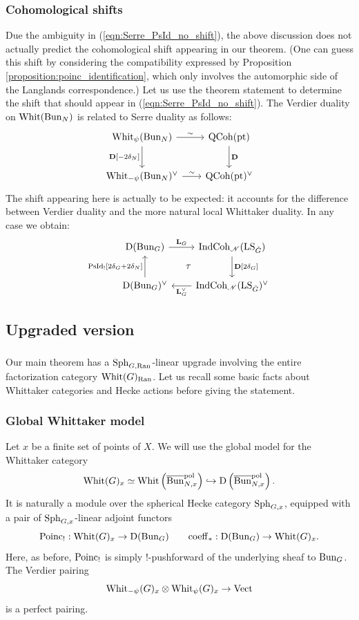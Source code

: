 \subsubsection{Cohomological shifts} Due the ambiguity in (\ref{eqn:Serre_PsId_no_shift}), the above discussion does not actually predict the cohomological shift appearing in our theorem. (One can guess this shift by considering the compatibility expressed by Proposition \ref{proposition:poinc_identification}, which only involves the automorphic side of the Langlands correspondence.) Let us use the theorem statement to determine the shift that should appear in (\ref{eqn:Serre_PsId_no_shift}). The Verdier duality on $\mathrm{Whit}(\mathrm{Bun}_N)$ is related to Serre duality as follows:
\[
\begin{tikzcd}[
  column sep={9em,between origins},
  row sep={4em,between origins}
]
  \Whit_\psi(\Bun_N) \arrow[r, "\sim"] \arrow[d, "\DD{[-2 \delta_N]}" left] & \QCoh(\pt) \arrow[d, "\DD"] \\
  \Whit_{-\psi}(\Bun_N)^\vee \arrow[r, "\sim"] & \QCoh(\pt)^\vee
\end{tikzcd}
\]
The shift appearing here is actually to be expected: it accounts for the difference between Verdier duality and the more natural local Whittaker duality. In any case we obtain:
\[
\begin{tikzcd}[
  column sep={9em,between origins},
  row sep={4em,between origins}
]
  \DMod(\Bun_G) \arrow[r, "\GLL_G"] \arrow[dr, phantom, "\tau"] & \ICoh_\Nilp(\LS_\LG) \arrow[d, "\DD {[2\delta_G]}"] \\
  \DMod(\Bun_G)^\vee \arrow[u, "\PsId_! {[2 \delta_G + 2 \delta_N]}"] & \ICoh_\Nilp(\LS_\LG)^\vee \arrow[l, "\GLL_G^\vee"]
\end{tikzcd}
\]

\subsection{Upgraded version}

\subsubsection{} Our main theorem has a $\mathrm{Sph}_{G,\mathrm{Ran}}$-linear upgrade involving the entire factorization category $\mathrm{Whit}(G)_{\mathrm{Ran}}$. Let us recall some basic facts about Whittaker categories and Hecke actions before giving the statement.

\subsubsection{Global Whittaker model} Let $x$ be a finite set of points of $X$. We will use the global model for the Whittaker category
    \[
    \mathrm{Whit}(G)_x \simeq \mathrm{Whit}\left(\overline{\mathrm{Bun}}_{N,x}^{\mathrm{pol}}\right) \hookrightarrow \mathrm{D}\left(\overline{\mathrm{Bun}}_{N,x}^{\mathrm{pol}} \right).
    \]
It is naturally a module over the spherical Hecke category $\mathrm{Sph}_{G,x}$, equipped with a pair of $\mathrm{Sph}_{G,x}$-linear adjoint functors
    \[
    \mathrm{Poinc}_! : \mathrm{Whit}(G)_x \to \mathrm{D}(\mathrm{Bun}_G)
    \qquad
    \mathrm{coeff}_* : \mathrm{D}(\mathrm{Bun}_G) \to \mathrm{Whit}(G)_x.
    \]
Here, as before, $\mathrm{Poinc}_!$ is simply $!$-pushforward of the underlying sheaf to $\mathrm{Bun}_G$. The Verdier pairing
    \[
    \mathrm{Whit}_{-\psi}(G)_x \otimes \mathrm{Whit}_\psi(G)_x \to \mathrm{Vect}
    \]
is a perfect pairing.

